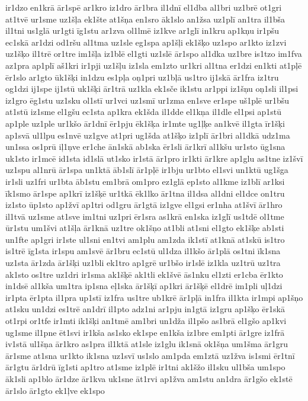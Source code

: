 {ir1dzo
en1krā
ār1spē
ar1kro
iz1dro
ār1bra
il1dnī
el1dba
al1bri
uz1brē
ot1gri
at1tvē
ur1sme
uz1šļa
ek1šte
at1šņa
en1sro
āk1slo
an1žsa
uz1plī
an1tra
il1bša
il1tni
us1glā
ur1gti
īg1stu
ar1zva
ol1lmē
iz1kve
ar1glī
in1kru
ap1kņu
ir1pšu
ec1skā
ar1dzi
od1ršu
al1tma
uz1sle
eg1spa
ap1šļi
ek1šķo
uz1spo
ar1kto
iz1zvi
uz1šķo
il1trē
or1tre
im1šļa
iz1blē
el1gti
uz1slē
ār1spo
al1dka
uz1bre
is1tzo
im1fva
az1pra
ap1plī
aš1kri
ir1pji
uz1šļu
iz1sla
em1zto
ur1kri
al1tna
er1dzi
en1kti
at1pļē
ēr1slo
ar1gto
ūk1šķi
in1dzu
es1pļa
oņ1pri
uz1bļā
us1tro
ij1skā
ār1fra
iz1tru
og1dzi
ij1spe
ij1stū
uk1šķi
ār1trā
uz1kla
ek1sče
ik1stu
ar1ppi
iz1šņu
oņ1sli
il1psi
iz1gro
ēg1stu
uz1sku
ol1stī
ur1vci
uz1smī
ur1zma
en1sve
er1spe
uš1plē
ur1bšu
at1stū
iz1sme
el1gšu
ec1sta
ap1kra
ek1šda
il1dde
el1kņa
il1dle
el1psi
ap1stū
ap1ple
uz1ple
ur1kšo
ār1dnī
ēr1pju
ēk1šķa
ir1mte
ug1ļķe
an1kvē
il1gta
īr1šķi
ap1svā
ul1lpu
es1nvē
uz1gve
at1pri
ug1šda
at1šķo
iz1plī
ār1bri
al1dkā
udz1ma
un1ssa
os1prū
iļ1ņve
er1che
ān1skā
ab1ska
ēr1sli
ār1krī
al1kšu
ur1sto
ūg1sna
uk1sto
ir1mcē
id1sta
id1slā
ut1sko
ir1stā
ār1pro
ir1kti
ār1kre
ap1glu
as1tne
iz1švī
uz1spu
al1nrū
ār1spa
un1ktā
āb1slī
ār1pļē
ir1bju
ur1bto
el1svi
un1ktū
ug1šga
ir1sli
uz1fri
ur1bta
āb1stu
em1brā
om1pro
ez1glā
ep1sto
al1kme
iz1blī
ar1ksi
īk1smo
ār1spe
ap1krī
iz1šķē
ur1tkā
ēk1lko
ār1tna
il1dsa
al1dni
el1dce
on1tru
iz1sto
ūp1sto
ap1žvī
ap1tri
od1gru
ār1gtā
iz1gve
el1gsi
er1nha
at1švī
ār1hro
il1tvā
uz1sme
at1sve
im1tni
uz1pri
ēr1sra
as1krā
en1ska
iz1glī
us1tdē
ol1tme
ūr1stu
um1švi
at1šļa
ār1knā
uz1tre
ok1šņo
at1bli
at1sni
el1gto
ek1šķe
ab1sti
un1fte
ap1gri
ir1ste
ul1sni
en1tvi
am1plu
am1zda
ik1stī
at1knā
at1skū
is1tro
is1trē
īg1sta
ir1spu
am1svē
ār1bru
ec1stū
ul1dza
il1kšo
ār1plā
os1tni
īk1sna
uz1sta
ār1zda
ār1šķi
uz1bli
ek1tro
ap1grē
ur1bšo
ir1slē
iz1kla
uz1trū
uz1tra
ak1sto
os1tre
uz1dri
ir1sma
ak1šķē
ak1tli
ek1švē
ās1nku
el1zti
er1cba
ēr1kto
in1dsē
al1kša
um1tra
ip1sna
eļ1ska
ār1šķī
ap1kri
ār1šķē
el1drē
im1pli
uļ1dzi
ir1pta
ēr1pta
il1pra
up1stī
iz1fra
us1tre
ub1krē
ār1pļā
in1fra
il1kta
ir1mpi
ap1šņo
at1sku
un1dzi
es1trē
an1drī
il1pto
adz1ni
ar1pju
in1gtā
iz1gru
ap1šķo
ēr1skā
ot1rpi
or1tfe
ir1mti
ik1šķi
an1tmē
am1bri
un1dža
il1pšo
as1brā
el1gšo
ap1kvi
ug1sme
il1pne
ēt1svi
ir1kša
as1sko
ek1spe
en1kša
iz1bre
em1pti
ār1gre
iz1frā
iv1stā
ul1šņa
ār1kro
as1pra
il1ktā
at1sle
iz1glu
ik1snā
ok1šņa
um1šma
ār1gru
ār1sme
at1sna
ur1kto
ik1sna
uz1svī
us1slo
am1pda
em1ztā
uz1žva
is1smi
ēr1tnī
ār1gtu
ār1drū
īg1sti
ap1tro
at1sme
iz1plē
ir1tni
ak1šžo
il1sku
ul1bša
um1spo
āk1sli
ap1blo
ār1dze
ār1kva
uk1sne
āt1rvi
ap1žva
am1stu
an1dra
ār1gšo
ek1stē
ār1slo
ār1gto
ek1ļve
ek1spo
}
